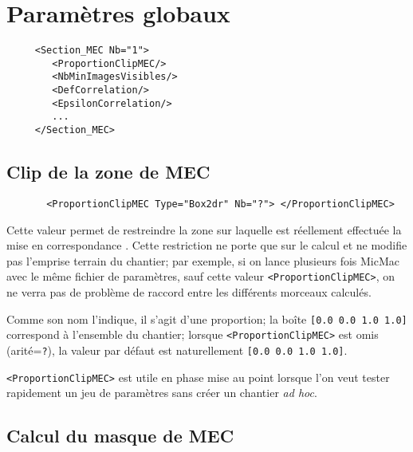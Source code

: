 
\section{Param\`etres globaux}

\label{TAG:MEC:GLOB}

\begin{verbatim}
     <Section_MEC Nb="1">
        <ProportionClipMEC/>
        <NbMinImagesVisibles/>
        <DefCorrelation/>
        <EpsilonCorrelation/>
        ...
     </Section_MEC>
\end{verbatim}



\subsection{Clip de la zone de MEC}

\begin{verbatim}
       <ProportionClipMEC Type="Box2dr" Nb="?"> </ProportionClipMEC>
\end{verbatim}

Cette valeur permet de restreindre la zone sur laquelle est
r\'eellement effectu\'ee la mise en correspondance . Cette 
restriction ne porte que sur le calcul et ne
modifie pas l'emprise terrain du chantier; par exemple, si on lance
plusieurs fois MicMac  avec  le m\^eme fichier de
param\`etres, sauf cette valeur {\tt <ProportionClipMEC>},
on ne verra pas de probl\`eme de raccord entre les
diff\'erents morceaux calcul\'es.

Comme son nom l'indique, il s'agit d'une proportion; la bo\^ite
{\tt [0.0 0.0 1.0 1.0]} correspond \`a l'ensemble du chantier;
lorsque  {\tt <ProportionClipMEC>} est omis (arit\'e={\tt ?}), 
la valeur par d\'efaut est naturellement {\tt [0.0 0.0 1.0 1.0]}.

{\tt <ProportionClipMEC>} est utile en phase mise au point
lorsque l'on veut tester rapidement un jeu de param\`etres
sans cr\'eer un chantier \emph{ad hoc}.



\subsection{Calcul du masque de MEC}

